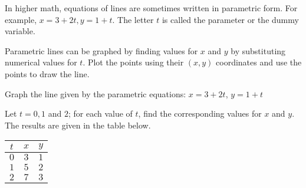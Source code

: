 In higher math, equations of lines are sometimes written in parametric form. For example, $x = 3 + 2t, y = 1 + t$. The letter $t$ is called the parameter or the dummy variable.

Parametric lines can be graphed by finding values for $x$ and $y$ by substituting numerical values for $t$. Plot the points using their $(x, y)$ coordinates and use the points to draw the line.

\begin{example}
Graph the line given by the parametric equations: $x = 3 + 2t$, $y = 1 + t$
\end{example}

\begin{solution} Let $t = 0, 1$ and $2$; for each value of $t$, find the corresponding values for $x$ and $y$. The results are given in the table below.

\begin{center}
\begin{tabular}{c|c|c}
    $t$ & $x$ & $y$ \\
    \hline
    $0$ & $3$ & $1$ \\
    $1$ & $5$ & $2$ \\
    $2$ & $7$ & $3$ \\
\end{tabular}
\end{center}

\begin{center}
\end{center}

\end{solution}
